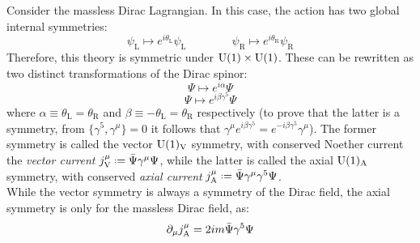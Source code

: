 Consider the massless Dirac Lagrangian. In this case, the action has two global internal symmetries:
\begin{equation*}
  \psi_\text{L} \mapsto e^{i \theta_\text{L}} \psi_\text{L}
  \qquad \qquad
  \psi_\text{R} \mapsto e^{i \theta_\text{R}} \psi_\text{R}
\end{equation*}
Therefore, this theory is symmetric under $ \mathrm{U}(1) \times \mathrm{U}(1) $. These can be rewritten as two distinct transformations of the Dirac spinor:
\begin{equation}
  \Psi \mapsto e^{i \alpha} \Psi
  \label{eq:dirac-u1-symm}
\end{equation}
\begin{equation}
  \Psi \mapsto e^{i \beta \gamma^5} \Psi
\end{equation}
where $ \alpha \equiv \theta_\text{L} = \theta_\text{R} $ and $ \beta \equiv - \theta_\text{L} = \theta_\text{R} $ respectively (to prove that the latter is a symmetry, from $ \{\gamma^5, \gamma^\mu\} = 0 $ it follows that $ \gamma^\mu e^{i \beta \gamma^5} = e^{-i \beta \gamma^5} \gamma^\mu $). The former symmetry is called the vector $ \mathrm{U}(1)_\text{V} $ symmetry, with conserved Noether current the \textit{vector current} $ j^\mu_\text{V} \defeq \bar{\Psi} \gamma^\mu \Psi $, while the latter is called the axial $ \mathrm{U}(1)_\text{A} $ symmetry, with conserved \textit{axial current} $ j^\mu_\text{A} \defeq \bar{\Psi} \gamma^\mu \gamma^5 \Psi $.\\
While the vector symmetry is always a symmetry of the Dirac field, the axial symmetry is only for the massless Dirac field, as:
\begin{equation}
  \partial_\mu j^\mu_\text{A} = 2 i m \bar{\Psi} \gamma^5 \Psi
\end{equation}










